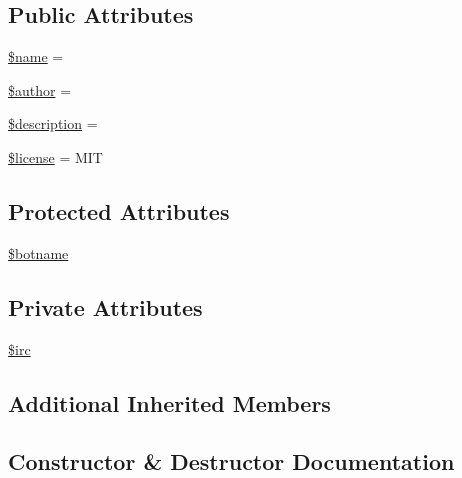 \subsection*{Public Attributes}
\begin{DoxyCompactItemize}
\item 
\hyperlink{classNet__SmartIRC__module__shabri_a03db7b1894653334db45217284781a32}{\$name} = \textquotesingle{}\textquotesingle{}
\item 
\hyperlink{classNet__SmartIRC__module__shabri_a1fde51b8caf0d0cd8631c47ee16ae501}{\$author} = \textquotesingle{}\textquotesingle{}
\item 
\hyperlink{classNet__SmartIRC__module__shabri_af61d6f8235505952dbe0922ce1524412}{\$description} = \textquotesingle{}\textquotesingle{}
\item 
\hyperlink{classNet__SmartIRC__module__shabri_a08fcbcccb2c24469862e98cba1911049}{\$license} = \textquotesingle{}M\+IT\textquotesingle{}
\end{DoxyCompactItemize}
\subsection*{Protected Attributes}
\begin{DoxyCompactItemize}
\item 
\hyperlink{classNet__SmartIRC__module__shabri_a0489141006148040b7ce77ecf5105deb}{\$botname}
\end{DoxyCompactItemize}
\subsection*{Private Attributes}
\begin{DoxyCompactItemize}
\item 
\hyperlink{classNet__SmartIRC__module__shabri_a6f5d61be96fc20ee5ffc8d07ccb2d578}{\$irc}
\end{DoxyCompactItemize}
\subsection*{Additional Inherited Members}


\subsection{Constructor \& Destructor Documentation}
